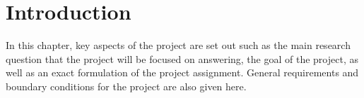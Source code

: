\section{Introduction}
In this chapter, key aspects of the project are set out such as the main research question that the project will be focused on answering, the goal of the project, as well as an exact formulation of the project assignment. General requirements and boundary conditions for the project are also given here.
